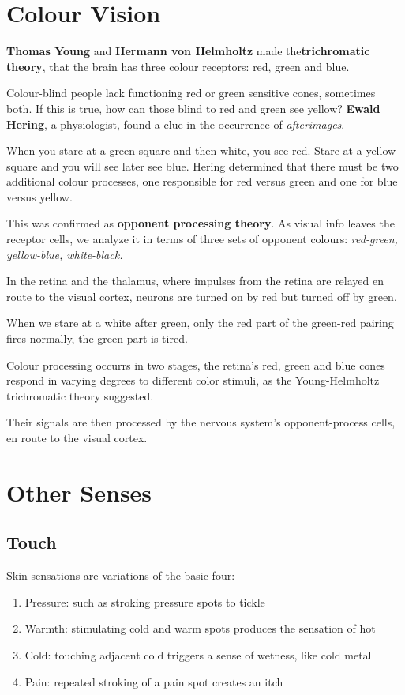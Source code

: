 \documentclass[12pt]{article}
\begin{document}
\section*{Colour Vision}
{\bf Thomas Young} and {\bf Hermann von Helmholtz} made the\textbf{trichromatic theory}, that the brain has three colour receptors: red, green and blue.

Colour-blind people lack functioning red or green sensitive cones, sometimes both. If this is true, how can those blind to red and green see yellow? {\bf Ewald Hering}, a physiologist, found a clue in the occurrence of \textit{afterimages}.

When you stare at a green square and then white, you see red. Stare at a yellow square and you will see later see blue. Hering determined that there must be two additional colour processes, one responsible for red versus green and one for blue versus yellow.

This was confirmed as \textbf{opponent processing theory}. As visual info leaves the receptor cells, we analyze it in terms of three sets of opponent colours: \textit{red-green, yellow-blue, white-black.}

In the retina and the thalamus, where impulses from the retina are relayed en route to the visual cortex, neurons are turned on by red but turned off by green. 

When we stare at a white after green, only the red part of the green-red pairing fires normally, the green part is tired.

Colour processing occurrs in two stages, the retina's red, green and blue cones respond in varying degrees to different color stimuli, as the Young-Helmholtz trichromatic theory suggested.

Their signals are then processed by the nervous system's opponent-process cells, en route to the visual cortex.

\section*{Other Senses}
\subsection*{Touch}
Skin sensations are variations of the basic four:
\begin{enumerate}
\item Pressure: such as stroking pressure spots to tickle
\item Warmth: stimulating cold and warm spots produces the sensation of hot
\item Cold: touching adjacent cold triggers a sense of wetness, like cold metal
\item Pain: repeated stroking of a pain spot creates an itch
\end{enumerate}
\end{document}
